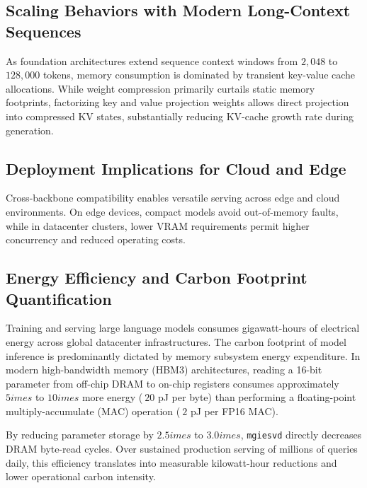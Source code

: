 \subsection{Scaling Behaviors with Modern Long-Context Sequences}
As foundation architectures extend sequence context windows from $2{,}048$ to $128{,}000$ tokens, memory consumption is dominated by transient key-value cache allocations. While weight compression primarily curtails static memory footprints, factorizing key and value projection weights allows direct projection into compressed KV states, substantially reducing KV-cache growth rate during generation.

\subsection{Deployment Implications for Cloud and Edge}
Cross-backbone compatibility enables versatile serving across edge and cloud environments. On edge devices, compact models avoid out-of-memory faults, while in datacenter clusters, lower VRAM requirements permit higher concurrency and reduced operating costs.

\subsection{Energy Efficiency and Carbon Footprint Quantification}
Training and serving large language models consumes gigawatt-hours of electrical energy across global datacenter infrastructures. The carbon footprint of model inference is predominantly dictated by memory subsystem energy expenditure. In modern high-bandwidth memory (HBM3) architectures, reading a 16-bit parameter from off-chip DRAM to on-chip registers consumes approximately $5	imes$ to $10	imes$ more energy ($~20$ pJ per byte) than performing a floating-point multiply-accumulate (MAC) operation ($~2$ pJ per FP16 MAC).

By reducing parameter storage by $2.5	imes$ to $3.0	imes$, \texttt{mgiesvd} directly decreases DRAM byte-read cycles. Over sustained production serving of millions of queries daily, this efficiency translates into measurable kilowatt-hour reductions and lower operational carbon intensity.
